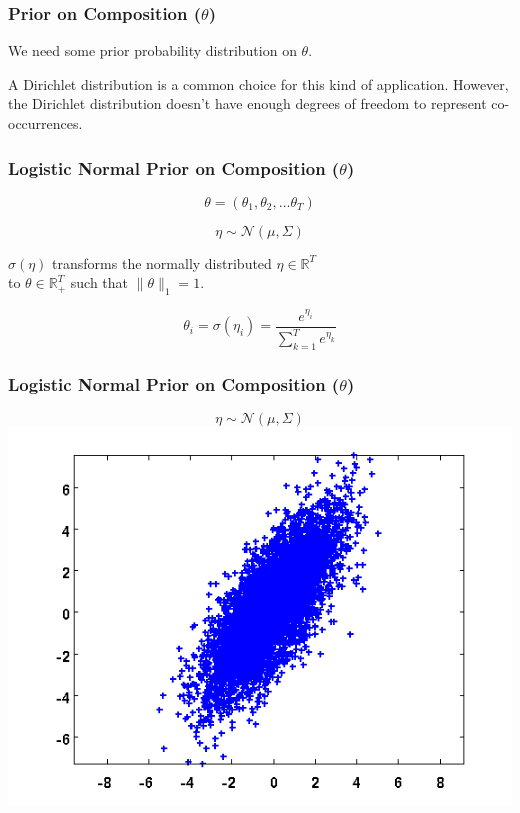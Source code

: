 \documentclass{beamer}
\providecommand{\norm}[2]{\lVert#2\rVert_#1}
\begin{document}
\begin{frame}
  \frametitle{Prior on Composition ($\theta$)}
  \begin{center}
    We need some prior probability distribution on $\theta$.
    \vspace{0.3in}

    A Dirichlet distribution is a common choice for this kind of application.
    However, the Dirichlet distribution doesn't have enough degrees of freedom to represent co-occurrences.
  \end{center}
\end{frame}

\begin{frame}
  \frametitle{Logistic Normal Prior on Composition ($\theta$)}
  \begin{center}
    \begin{equation*}
      \theta = ( \theta_1, \theta_2, \dots \theta_T )
    \end{equation*}

    \begin{equation*}
      \eta \sim \mathcal{N}(\mu, \Sigma)
    \end{equation*}

    $\sigma(\eta)$ transforms the normally distributed $\eta \in \mathbb{R}^T$ \\
    to $\theta \in \mathbb{R}_+^T$ such that $\norm{1}{\theta} = 1$.

    \begin{equation*}
      \theta_i = \sigma(\eta_i) = \frac{e^{\eta_i}}{\sum_{k=1}^{T}e^{\eta_k}}
    \end{equation*}
  \end{center}
\end{frame}

\begin{frame}
  \frametitle{Logistic Normal Prior on Composition ($\theta$)}
  \begin{center}
    \vspace{-0.4in}
    \begin{equation*}
      \eta \sim \mathcal{N}(\mu, \Sigma)
    \end{equation*}
    \includegraphics[scale=0.6]{img/log-normal-figs/normal-1.png}
  \end{center}
\end{frame}
\end{document}
